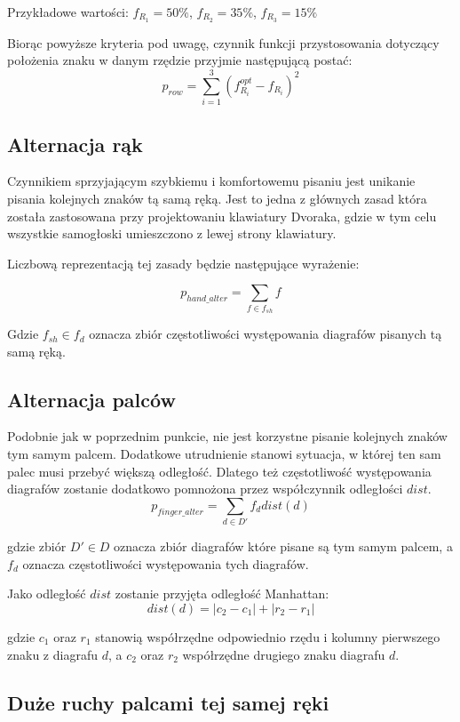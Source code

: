 \documentclass[brudnopis]{xmgr}
\begin{document}
Przykładowe wartości: $f_{R_1} = 50\%$, $f_{R_2} = 35\%$, $f_{R_3} = 15\%$

Biorąc powyższe kryteria pod uwagę, czynnik funkcji przystosowania dotyczący położenia znaku w danym rzędzie przyjmie następującą postać:
$$ p_{row} = \sum\limits_{i = 1}^{3} (f_{R_i}^{opt} - f_{R_i})^2 $$


\subsection{Alternacja rąk}

Czynnikiem sprzyjającym szybkiemu i komfortowemu pisaniu jest unikanie pisania kolejnych znaków tą samą ręką. Jest to jedna z głównych zasad która została zastosowana przy projektowaniu klawiatury Dvoraka, gdzie w tym celu wszystkie samogłoski umieszczono z lewej strony klawiatury.

Liczbową reprezentacją tej zasady będzie następujące wyrażenie:

$$ p_{hand\_alter} = \sum\limits_{f \in f_{sh}} f $$

Gdzie $ f_{sh} \in f_d $ oznacza zbiór częstotliwości występowania diagrafów pisanych tą samą ręką.


\subsection{Alternacja palców}

Podobnie jak w poprzednim punkcie, nie jest korzystne pisanie kolejnych znaków tym samym palcem. Dodatkowe utrudnienie stanowi sytuacja, w której ten sam palec musi przebyć większą odległość. Dlatego też częstotliwość występowania diagrafów zostanie dodatkowo pomnożona przez współczynnik odległości $dist$.
$$ p_{finger\_alter} = \sum\limits_{d \in D'} f_d dist(d) $$

\noindent
gdzie zbiór $ D' \in D $ oznacza zbiór diagrafów które pisane są tym samym palcem, a $f_d$ oznacza częstotliwości występowania tych diagrafów.\newline

Jako odległość $dist$ zostanie przyjęta odległość Manhattan:
$$ dist(d) = |c_2 - c_1| + |r_2 - r_1| $$

gdzie $c_1$ oraz $r_1$ stanowią współrzędne odpowiednio rzędu i kolumny pierwszego znaku z diagrafu $d$, a $c_2$ oraz $r_2$ współrzędne drugiego znaku diagrafu $d$.


\subsection{Duże ruchy palcami tej samej ręki}
\end{document}

